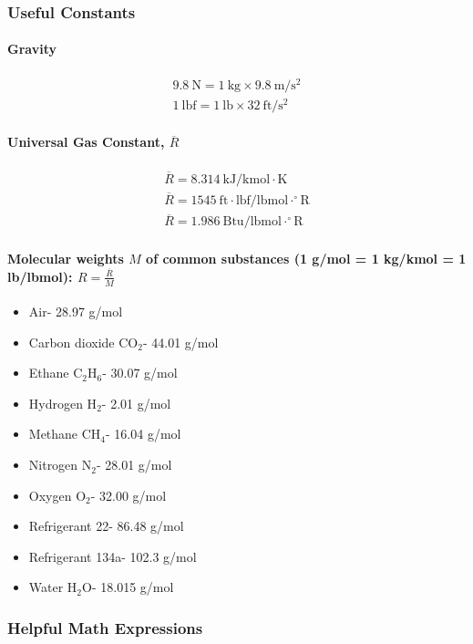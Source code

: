 \subsubsection{Useful Constants}
\paragraph{Gravity}
\begin{align*}
    9.8~\textrm{N} = 1~\textrm{kg}\times 9.8~ \textrm{m}/\textrm{s}^2 \\
    1~\textrm{lbf} = 1~\textrm{lb}\times 32~ \textrm{ft}/\textrm{s}^2
\end{align*}
\paragraph{Universal Gas Constant, $\overline{R}$}
\begin{align*}
    \overline {R} = 8.314~\textrm{kJ/kmol}\cdot \textrm{K} \\
    \overline {R} = 1545~\textrm{ft}\cdot \textrm{lbf}/\textrm{lbmol}\cdot ^{\circ}\textrm{R} \\
    \overline {R} = 1.986~\textrm{Btu}/\textrm{lbmol}\cdot ^{\circ}\textrm{R} 
\end{align*}
\paragraph{Molecular weights $M$ of common substances (1 g/mol = 1 kg/kmol = 1 lb/lbmol): $R= \frac{\overline{R}}{M}$}
\begin{itemize}
    \item Air- 28.97 g/mol
    \item Carbon dioxide CO$_2$- 44.01 g/mol
    \item Ethane C$_2$H$_6$- 30.07 g/mol
    \item Hydrogen H$_2$- 2.01 g/mol
    \item Methane CH$_4$- 16.04 g/mol
    \item Nitrogen N$_2$- 28.01 g/mol
    \item Oxygen O$_2$- 32.00 g/mol
    \item Refrigerant 22- 86.48 g/mol
    \item Refrigerant 134a- 102.3 g/mol
    \item Water H$_2$O- 18.015 g/mol
\end{itemize}
\subsubsection{Helpful Math Expressions}
